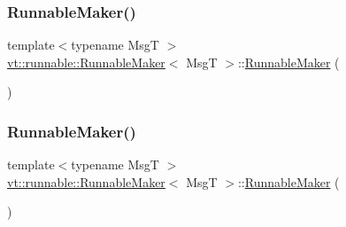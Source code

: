 \subsubsection{\texorpdfstring{Runnable\+Maker()}{RunnableMaker()}\hspace{0.1cm}{\footnotesize\ttfamily [2/3]}}
{\footnotesize\ttfamily template$<$typename MsgT $>$ \\
\hyperlink{structvt_1_1runnable_1_1_runnable_maker}{vt\+::runnable\+::\+Runnable\+Maker}$<$ MsgT $>$\+::\hyperlink{structvt_1_1runnable_1_1_runnable_maker}{Runnable\+Maker} (\begin{DoxyParamCaption}\item[{\hyperlink{structvt_1_1runnable_1_1_runnable_maker}{Runnable\+Maker}$<$ MsgT $>$ const \&}]{ }\end{DoxyParamCaption})\hspace{0.3cm}{\ttfamily [delete]}}

\mbox{\label{structvt_1_1runnable_1_1_runnable_maker_abeee34efa8b7bc1586727bee5f71c6d4}} 
\subsubsection{\texorpdfstring{Runnable\+Maker()}{RunnableMaker()}\hspace{0.1cm}{\footnotesize\ttfamily [3/3]}}
{\footnotesize\ttfamily template$<$typename MsgT $>$ \\
\hyperlink{structvt_1_1runnable_1_1_runnable_maker}{vt\+::runnable\+::\+Runnable\+Maker}$<$ MsgT $>$\+::\hyperlink{structvt_1_1runnable_1_1_runnable_maker}{Runnable\+Maker} (\begin{DoxyParamCaption}\item[{\hyperlink{structvt_1_1runnable_1_1_runnable_maker}{Runnable\+Maker}$<$ MsgT $>$ \&\&}]{ }\end{DoxyParamCaption})\hspace{0.3cm}{\ttfamily [default]}}

\mbox{\label{structvt_1_1runnable_1_1_runnable_maker_a0700d91c1114ae97ac74a4841ec2499c}} 
